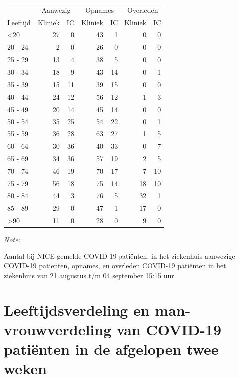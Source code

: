 \documentclass[
  english,
  man,floatsintext]{apa6}
\begin{document}
\begin{table}
\centering\begingroup\fontsize{10}{12}\selectfont

\begin{threeparttable}
\begin{tabular}{lrrrrrr}
\toprule
\multicolumn{1}{c}{ } & \multicolumn{2}{c}{Aanwezig} & \multicolumn{2}{c}{Opnames} & \multicolumn{2}{c}{Overleden} \\
\cmidrule(l{3pt}r{3pt}){2-3} \cmidrule(l{3pt}r{3pt}){4-5} \cmidrule(l{3pt}r{3pt}){6-7}
Leeftijd & Kliniek & IC & Kliniek & IC & Kliniek & IC\\
\midrule
<20 & 27 & 0 & 43 & 1 & 0 & 0\\
20 - 24 & 2 & 0 & 26 & 0 & 0 & 0\\
25 - 29 & 13 & 4 & 38 & 5 & 0 & 0\\
30 - 34 & 18 & 9 & 43 & 14 & 0 & 1\\
35 - 39 & 15 & 11 & 39 & 15 & 0 & 0\\
40 - 44 & 24 & 12 & 56 & 12 & 1 & 3\\
45 - 49 & 20 & 14 & 45 & 14 & 0 & 0\\
50 - 54 & 35 & 25 & 54 & 22 & 0 & 1\\
55 - 59 & 36 & 28 & 63 & 27 & 1 & 5\\
60 - 64 & 30 & 36 & 40 & 33 & 0 & 7\\
65 - 69 & 34 & 36 & 57 & 19 & 2 & 5\\
70 - 74 & 46 & 19 & 70 & 17 & 7 & 10\\
75 - 79 & 56 & 18 & 75 & 14 & 18 & 10\\
80 - 84 & 44 & 3 & 76 & 5 & 32 & 1\\
85 - 89 & 29 & 0 & 47 & 1 & 17 & 0\\
>90 & 11 & 0 & 28 & 0 & 9 & 0\\
\bottomrule
\end{tabular}
\begin{tablenotes}
\item \textit{Note: } 
\item Aantal bij NICE gemelde COVID-19 patiënten: in het ziekenhuis aanwezige COVID-19 patiënten, opnames, en overleden COVID-19 patiënten in het ziekenhuis van 21 augustus t/m 04 september 15:15 uur
\end{tablenotes}
\end{threeparttable}
\endgroup{}
\end{table}

\newpage

\hypertarget{leeftijdsverdeling-en-man-vrouwverdeling-van-covid-19-patiuxebnten-in-de-afgelopen-twee-weken}{%
\section{Leeftijdsverdeling en man-vrouwverdeling van COVID-19 patiënten in de afgelopen twee weken}\label{leeftijdsverdeling-en-man-vrouwverdeling-van-covid-19-patiuxebnten-in-de-afgelopen-twee-weken}}
\end{document}
